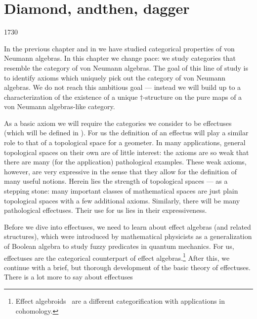
\chapter{Diamond, andthen, dagger}\label{chapter2}

\begin{parsec}{1730}%
\begin{point}{10}%
In the previous chapter and in \cite{bram}
    we have studied categorical properties of von Neumann algebras.
In this chapter we change pace:
    we study categories that resemble the
    category of von Neumann algebras.
The goal of this line of study is to identify
    axioms which uniquely pick out the category of von Neumann algebras.
We do not reach this ambitious goal ---
    instead we will build up to a characterization of
    the existence of a unique $\dagger$-structure
    on the pure maps of a von Neumann algebras-like category.
\end{point}
\begin{point}{20}%
As a basic axiom we will require the categories we consider to be
    effectuses (which will be defined in ).
For us the definition of an effectus will play a similar role
    to that of a topological space for a geometer.
In many applications,
    general topological spaces on their own are of little interest:
    the axioms are so weak that there are
    many (for the application) pathological examples.
    These weak axioms, however, are very expressive in the sense
    that they allow for the definition of many useful notions.
    Herein lies the strength of topological spaces ---
    as a stepping stone:
    many important classes of mathematical spaces
    are just plain topological spaces with a few additional axioms.
Similarly, there will be many pathological effectuses.
Their use for us lies in their expressiveness.
\end{point}
\begin{point}{30}%
Before we dive into effectuses,
    we need to learn about effect algebras (and related structures),
    which were introduced by mathematical physicists as
    a generalization of Boolean algebra to study fuzzy predicates
    in quantum mechanics.
For us, effectuses are the
    categorical counterpart of effect algebras.\footnote{Effect
    algebroids~\cite{roumen,roumen2016cohomology} are a different
    categorification with applications in cohomology.}
After this, we continue with a brief, but thorough development
    of the basic theory of effectuses.
There is a lot more to say about effectuses

\end{point}
\end{parsec}
